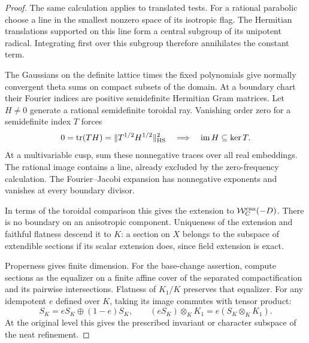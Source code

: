 \begin{proof}
The same calculation applies to translated tests. For a rational
parabolic choose a line in the smallest nonzero space of its
isotropic flag. The Hermitian translations supported on this
line form a central subgroup of its unipotent radical. Integrating
first over this subgroup therefore annihilates the constant term.

The Gaussians on the definite lattice times the fixed polynomials
give normally convergent theta sums on compact subsets of the
domain. At a boundary chart their Fourier indices are positive
semidefinite Hermitian Gram matrices. Let \(H\ne0\) generate a rational semidefinite toroidal ray.
Vanishing order zero for a semidefinite index \(T\) forces
\[
  0=\operatorname{tr}(TH)
    =\|T^{1/2}H^{1/2}\|_{\rm HS}^2
    \quad\Longrightarrow\quad \operatorname{im}H\subseteq\ker T .
\]
At a multivariable cusp, sum these nonnegative traces over all real
embeddings. The rational image contains a line, already excluded by the
zero-frequency calculation. The Fourier--Jacobi expansion has nonnegative
exponents and vanishes at every boundary divisor.

In terms of the toroidal comparison this gives the extension to
\(\mathcal W^{\rm can}_{\mathbb C}(-D)\).
\cite[Section~1, p.~1788]{lan-stroh-subcanonical}
There is no boundary on an anisotropic component. Uniqueness of the
extension and faithful flatness descend it to \(K\): a section on
\(X\) belongs to the subspace of extendible sections if its scalar
extension does, since field extension is exact.

Properness gives finite dimension. For the base-change assertion,
compute sections as the equalizer on a finite affine cover of the
separated compactification and its pairwise intersections. Flatness
of \(K_1/K\) preserves that equalizer. For any idempotent \(e\)
defined over \(K\), taking its image commutes with tensor product:
\[
    S_K=eS_K\oplus(1-e)S_K,\qquad
    (eS_K)\otimes_K K_1=e(S_K\otimes_K K_1).
\]
At the original level this gives the
prescribed invariant or character subspace of the neat refinement.
\end{proof}

